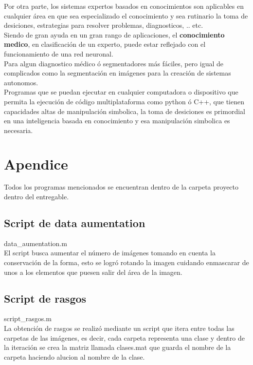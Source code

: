\documentclass[a4paper, 11pt]{article}
\begin{document}
Por otra parte, los sistemas expertos basados en conocimientos son aplicables en cualquier  área en que sea especializado el conocimiento y sea rutinario la toma de desiciones, estrategias para resolver problemas, diagnosticos, .. etc.\\
Siendo de gran ayuda en un gran rango de aplicaciones, el \textbf{conocimiento medico}, en clasificación de un experto, puede estar reflejado con el funcionamiento de una red neuronal.\\

Para algun diagnostico médico ó segmentadores más fáciles, pero igual de complicados como la segmentación en imágenes para la creación de sistemas autonomos.\\

Programas que se puedan ejecutar en cualquier computadora o dispositivo que permita la ejecución de código multiplataforma como python ó C++, que tienen capacidades altas de manipulación simbolica, la toma de desiciones es primordial en una inteligencia basada en conocimiento y esa manipulación simbolica es necesaria.

\newpage
\section{Apendice}

Todos los programas mencionados se encuentran dentro de la carpeta proyecto dentro del entregable.

\subsection{Script de data aumentation}

data\_aumentation.m\\

El script busca aumentar el número de imágenes tomando en cuenta la conservación de la forma, esto se logró rotando la imagen cuidando enmascarar de unos a los elementos que puesen salir del área de la imagen.\\

\subsection{Script de rasgos}

script\_rasgos.m\\

La obtención de rasgos se realizó mediante un script que itera entre todas las carpetas de las imágenes, es decir, cada carpeta representa una clase y dentro de la iteración se crea la matriz llamada clases.mat que guarda el nombre de la carpeta haciendo alucion al nombre de la clase.\\
\end{document}
